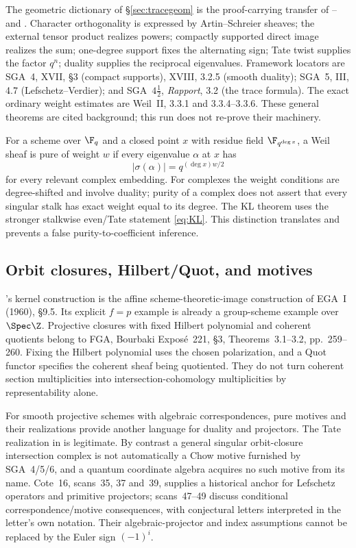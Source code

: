 The geometric dictionary of \S\ref{sec:tracegeom} is the proof-carrying transfer of -- and . Character orthogonality is expressed by Artin--Schreier sheaves; the external tensor product realizes powers; compactly supported direct image realizes the sum; one-degree support fixes the alternating sign; Tate twist supplies the factor $q^n$; duality supplies the reciprocal eigenvalues. Framework locators are SGA~4, XVII, \S3 (compact supports), XVIII, 3.2.5 (smooth duality); SGA~5, III, 4.7 (Lefschetz--Verdier); and SGA~$4\frac12$, \emph{Rapport}, 3.2 (the trace formula). The exact ordinary weight estimates are Weil~II, 3.3.1 and 3.3.4--3.3.6. These general theorems are cited background; this run does not re-prove their machinery.

For a scheme over $\F_q$ and a closed point $x$ with residue field $\F_{q^{\deg x}}$, a Weil sheaf is pure of weight $w$ if every eigenvalue $\alpha$ at $x$ has
\[
 |\sigma(\alpha)|=q^{(\deg x)w/2}
\]
for every relevant complex embedding. For complexes the weight conditions are degree-shifted and involve duality; purity of a complex does not assert that every singular stalk has exact weight equal to its degree. The KL theorem uses the stronger stalkwise even/Tate statement \eqref{eq:KL}. This distinction translates  and prevents a false purity-to-coefficient inference.

\subsection{Orbit closures, Hilbert/Quot, and motives}
's kernel construction is the affine scheme-theoretic-image construction of EGA~I (1960), \S9.5. Its explicit $f=p$ example is already a group-scheme example over $\Spec\Z$. Projective closures with fixed Hilbert polynomial and coherent quotients belong to FGA, Bourbaki Expos\'e~221, \S3, Theorems~3.1--3.2, pp.~259--260. Fixing the Hilbert polynomial uses the chosen polarization, and a Quot functor specifies the coherent sheaf being quotiented. They do not turn coherent section multiplicities into intersection-cohomology multiplicities by representability alone.

For smooth projective schemes with algebraic correspondences, pure motives and their realizations provide another language for duality and projectors. The Tate realization in  is legitimate. By contrast a general singular orbit-closure intersection complex is not automatically a Chow motive furnished by SGA~4/5/6, and a quantum coordinate algebra acquires no such motive from its name. Cote~16, scans~35, 37 and~39, supplies a historical anchor for Lefschetz operators and primitive projectors; scans~47--49 discuss conditional correspondence/motive consequences, with conjectural letters interpreted in the letter's own notation. Their algebraic-projector and index assumptions cannot be replaced by the Euler sign $(-1)^i$.

